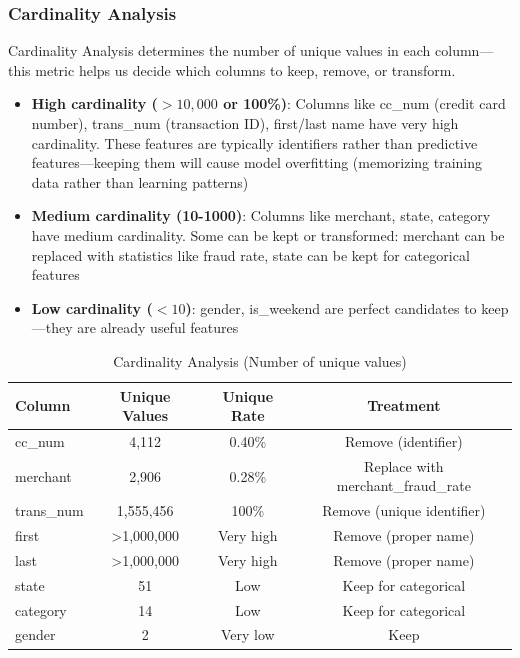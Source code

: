 \subsubsection{Cardinality Analysis}
Cardinality Analysis determines the number of unique values in each column---this metric helps us decide which columns to keep, remove, or transform. 
\begin{itemize}
    \item \textbf{High cardinality ($>10,000$ or 100\%)}: Columns like cc\_num (credit card number), trans\_num (transaction ID), first/last name have very high cardinality. These features are typically identifiers rather than predictive features---keeping them will cause model overfitting (memorizing training data rather than learning patterns)
    \item \textbf{Medium cardinality (10-1000)}: Columns like merchant, state, category have medium cardinality. Some can be kept or transformed: merchant can be replaced with statistics like fraud rate, state can be kept for categorical features
    \item \textbf{Low cardinality ($<10$)}: gender, is\_weekend are perfect candidates to keep---they are already useful features
\end{itemize}

\begin{table}[!h]
\centering
\caption{Cardinality Analysis (Number of unique values)}
\footnotesize
\begin{tabular}{|l|c|c|c|}
\hline
\textbf{Column} & \textbf{Unique Values} & \textbf{Unique Rate} & \textbf{Treatment} \\
\hline
cc\_num & 4,112 & 0.40\% & Remove (identifier) \\
\hline
merchant & 2,906 & 0.28\% & Replace with merchant\_fraud\_rate \\
\hline
trans\_num & 1,555,456 & 100\% & Remove (unique identifier) \\
\hline
first & >1,000,000 & Very high & Remove (proper name) \\
\hline
last & >1,000,000 & Very high & Remove (proper name) \\
\hline
state & 51 & Low & Keep for categorical \\
\hline
category & 14 & Low & Keep for categorical \\
\hline
gender & 2 & Very low & Keep \\
\hline
\end{tabular}
\end{table}

